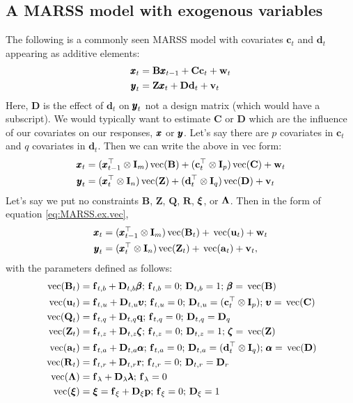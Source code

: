 \documentclass[]{article}
\def\uupsilon{\pmb{\upsilon}}
\def\llambda{\pmb{\lambda}}
\def\bbeta{\pmb{\beta}}
\def\aalpha{\pmb{\alpha}}
\def\zzeta{\pmb{\zeta}}
\def\xixi{\mbox{\boldmath $\xi$}}
\def\LAM{\mbox{\boldmath $\Lambda$}}
\def\UPS{\mbox{\boldmath $\Upsilon$}}
\def\XI{\mbox{\boldmath $\Xi$}}
\def\BB{\mbox{$\mathbf B$}}	\def\bb{\mbox{$\mathbf b$}} \def\Bb{\mbox{$\mathbf J$}} \def\Ba{\mbox{$\mathbf L$}} \def\Bm{\UPS}
\def\CC{\mbox{$\mathbf C$}}	\def\cc{\mbox{$\mathbf c$}}
\def\DD{\mbox{$\mathbf D$}}	\def\dd{\mbox{$\mathbf d$}}
\def\II{\mbox{$\mathbf I$}} \def\ii{\mbox{$\mathbf i$}}
\def\QQ{\mbox{$\mathbf Q$}}	 \def\qq{\mbox{$\mathbf q$}} \def\Qb{\mbox{$\mathbf G$}}  \def\Qm{\mathbb{Q}}
\def\RR{\mbox{$\mathbf R$}}	 \def\rr{\mbox{$\mathbf r$}} \def\Rb{\mbox{$\mathbf H$}}	\def\Rm{\mathbb{R}}
\def\ZZ{\mbox{$\mathbf Z$}}	\def\zz{\mbox{$\mathbf z$}}	\def\Zb{\mbox{$\mathbf M$}} \def\Za{\mbox{$\mathbf N$}} \def\Zm{\XI}
\def\vec{\,\textup{\textrm{vec}}}
\begin{document}
\subsection{A MARSS model with exogenous variables}
The following is a commonly seen MARSS model with covariates $\cc_t$ and $\dd_t$ appearing as additive elements:
\begin{equation*}
\begin{split}
\xx_t &= \BB\xx_{t-1} + \CC\cc_t + \ww_t\\
\yy_t &= \ZZ\xx_t + \DD\dd_t + \vv_t 
\end{split}
\end{equation*}
Here, $\DD$ is the effect of $\dd_t$ on $\mbox{$\pmb{y}$}_t$ not a design matrix (which would have a subscript).  We would typically want to estimate $\CC$ or $\DD$ which are the influence of our covariates on our responses, $\mbox{$\pmb{x}$}$ or $\mbox{$\pmb{y}$}$.  Let's say there are $p$ covariates in $\cc_t$ and $q$ covariates in $\dd_t$.  Then we can write the above in vec form:
\begin{equation}\label{eq:MARSS.simple.ex}
\begin{split}
\xx_t &= (\xx_{t-1}^\top \otimes \II_m)\vec(\BB) + (\cc_t^\top \otimes \II_p)\vec(\CC) + \ww_t\\
\yy_t &= (\xx_t^\top \otimes \II_n)\vec(\ZZ) + (\dd_t^\top \otimes \II_q)\vec(\DD) + \vv_t 
\end{split}
\end{equation}
Let's say we put no constraints $\BB$, $\ZZ$, $\QQ$, $\RR$, $\xixi$, or $\LAM$.  Then in the form of equation \ref{eq:MARSS.ex.vec},
\begin{equation*}
\begin{split}
\xx_t &= (\xx_{t-1}^\top \otimes \II_m)\vec(\BB_t) + \vec(\uu_t) + \ww_t\\
\yy_t &= (\xx_t^\top \otimes \II_n)\vec(\ZZ_t) + \vec(\aa_t) + \vv_t,
\end{split}
\end{equation*}
with the parameters defined as follows:
\begin{equation*}
\begin{split}
\vec(\BB_t) &= \ff_{t,b} + \DD_{t,b}\bbeta;
\, \ff_{t,b} = 0;\, \DD_{t,b}=1;\, \bbeta=\vec(\BB)\\
\vec(\uu_t) &= \ff_{t,u} + \DD_{t,u}\uupsilon;
\, \ff_{t,u} = 0;\, \DD_{t,u}=(\cc_t^\top \otimes \II_p);\, \uupsilon=\vec(\CC)\\
\vec(\QQ_t) &= \ff_{t,q} + \DD_{t,q}\qq;
\, \ff_{t,q}= 0;\,  \DD_{t,q}= \DD_q \\
\vec(\ZZ_t) &= \ff_{t,z} + \DD_{t,z}\zzeta;
\, \ff_{t,z} = 0;\, \DD_{t,z}=1;\, \zzeta=\vec(\ZZ)\\
\vec(\aa_t) &= \ff_{t,a} + \DD_{t,a}\aalpha;
\, \ff_{t,a} = 0;\, \DD_{t,a}=(\dd_t^\top \otimes \II_q);\, \aalpha=\vec(\DD)\\
\vec(\RR_t) &= \ff_{t,r} + \DD_{t,r}\rr;
\, \ff_{t,r}= 0;\,  \DD_{t,r}= \DD_r \\
\vec(\LAM)&= \ff_\lambda+\DD_\lambda\llambda;
\, \ff_\lambda= 0 \\
\vec(\xixi)&= \xixi=\ff_\xi+\DD_\xi\pp;
\, \ff_\xi = 0; \, \DD_\xi = 1
\end{split}
\end{equation*}
\end{document}
